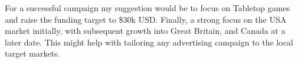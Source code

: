\documentclass{article}
\begin{document}
\medskip 

\noindent For a successful campaign my suggestion would be to focus on Tabletop games and raise the funding target to \$30k USD. Finally, a strong focus on the USA market initially, with subsequent growth into Great Britain, and Canada at a later date. This might help with tailoring any advertising campaign to the local target markets. 
















    \begin{figure}[t!]
        \hfill
        \\   
\end{figure}
\end{document}
